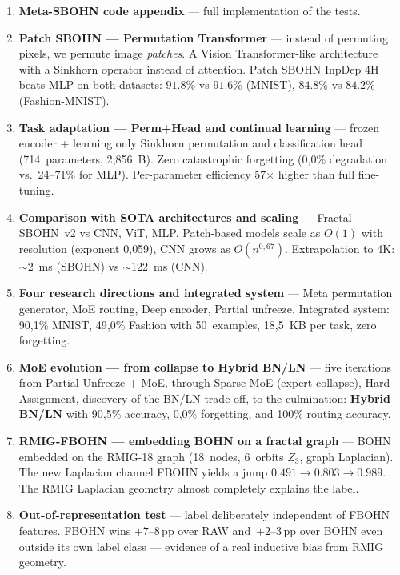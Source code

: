 \documentclass[11pt,a4paper]{report}
\begin{document}
\begin{enumerate}
\item \textbf{Meta-SBOHN code appendix} --- full implementation of the tests.

\item \textbf{Patch SBOHN --- Permutation Transformer} --- instead of permuting pixels, we permute image \emph{patches}. A Vision Transformer-like architecture with a Sinkhorn operator instead of attention. Patch SBOHN InpDep 4H beats MLP on both datasets: $91.8\%$ vs $91.6\%$ (MNIST), $84.8\%$ vs $84.2\%$ (Fashion-MNIST).

\item \textbf{Task adaptation --- Perm+Head and continual learning} --- frozen encoder + learning only Sinkhorn permutation and classification head (714~parameters, 2{,}856~B). Zero catastrophic forgetting (0{,}0\% degradation vs.\ 24--71\% for MLP). Per-parameter efficiency 57$\times$ higher than full fine-tuning.

\item \textbf{Comparison with SOTA architectures and scaling} --- Fractal SBOHN~v2 vs CNN, ViT, MLP. Patch-based models scale as $O(1)$ with resolution (exponent 0{,}059), CNN grows as $O(n^{0{,}67})$. Extrapolation to 4K: $\sim$2~ms (SBOHN) vs $\sim$122~ms (CNN).

\item \textbf{Four research directions and integrated system} --- Meta permutation generator, MoE routing, Deep encoder, Partial unfreeze. Integrated system: 90{,}1\% MNIST, 49{,}0\% Fashion with 50~examples, 18{,}5~KB per task, zero forgetting.

\item \textbf{MoE evolution --- from collapse to Hybrid BN/LN} --- five iterations from Partial Unfreeze + MoE, through Sparse MoE (expert collapse), Hard Assignment, discovery of the BN/LN trade-off, to the culmination: \textbf{Hybrid BN/LN} with 90{,}5\% accuracy, 0{,}0\% forgetting, and 100\% routing accuracy.

\item \textbf{RMIG-FBOHN --- embedding BOHN on a fractal graph} --- BOHN embedded on the RMIG-18 graph (18~nodes, 6~orbits $Z_3$, graph Laplacian). The new Laplacian channel FBOHN yields a jump $0.491\to 0.803\to 0.989$. The RMIG Laplacian geometry almost completely explains the label.

\item \textbf{Out-of-representation test} --- label deliberately independent of FBOHN features. FBOHN wins $+7$--$8$\,pp over RAW and~$+2$--$3$\,pp over BOHN even outside its own label class --- evidence of a real inductive bias from RMIG geometry.


\end{enumerate}
\end{document}

